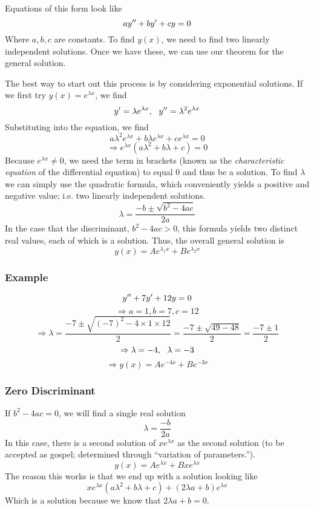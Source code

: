 \documentclass[12pt]{report}
\begin{document}
\begin{flushleft}
Equations of this form look like
\[ay^{\prime\prime} + by^\prime + cy = 0\]
Where \(a, b, c\) are constants. To find \(y(x)\), we need to find two linearly
independent solutions. Once we have these, we can use our theorem for the
general solution. \par
The best way to start out this process is by considering exponential solutions.
If we first try \(y(x) = e^{\lambda x}\), we find
\[y^\prime = \lambda e^{\lambda x}, \:\:\: y^{\prime\prime} 
= \lambda^2e^{\lambda x}\]
Substituting into the equation, we find
\[a\lambda^2e^{\lambda x} + b\lambda e^{\lambda x} + ce^{\lambda x} = 0\]
\[\Rightarrow e^{\lambda x}(a\lambda^2 + b\lambda + c) = 0\]
Because \(e^{\lambda x} \neq 0\), we need the term in brackets (known as the
\textit{characteristic equation} of the differential equation) to equal \(0\)
and thus be a solution. To find \(\lambda\) we can simply use the quadratic
formula, which conveniently yields a positive and negative value; i.e. two
linearly independent solutions.
\[\lambda = \frac{-b \pm \sqrt{b^2 - 4ac}}{2a}\]
In the case that the discriminant, \(b^2 - 4ac > 0\), this formula yields two
distinct real values, each of which is a solution. Thus, the overall general
solution is
\[y(x) = Ae^{\lambda_1 x} + Be^{\lambda_2 x}\]

\subsubsection*{Example}

\[y^{\prime\prime} + 7y^\prime + 12y = 0\]
\[\Rightarrow a = 1, b = 7, c = 12\]
\[\Rightarrow \lambda = \frac{-7 \pm \sqrt{(-7)^2 -4\times1\times12}}{2}
= \frac{-7 \pm \sqrt{49 - 48}}{2} = \frac{-7 \pm 1}{2}\]
\[\Rightarrow \lambda = -4, \:\:\:\lambda = -3\]
\[\Rightarrow y(x) = Ae^{-4x} + Be^{-3x}\]

\subsubsection*{Zero Discriminant}

If \(b^2 - 4ac = 0\), we will find a single real solution
\[\lambda = \frac{-b}{2a}\]
In this case, there is a second solution of \(xe^{\lambda x}\) as the second
solution (to be accepted as gospel; determined through ``variation of
parameters.'').
\[y(x) = Ae^{\lambda x} + Bxe^{\lambda x}\]
The reason this works is that we end up with a solution looking like
\[xe^{\lambda x}(a\lambda^2 + b\lambda + c) + (2\lambda a + b)e^{\lambda x}\]
Which is a solution because we know that \(2\lambda a + b = 0\).


\end{flushleft}
\end{document}
